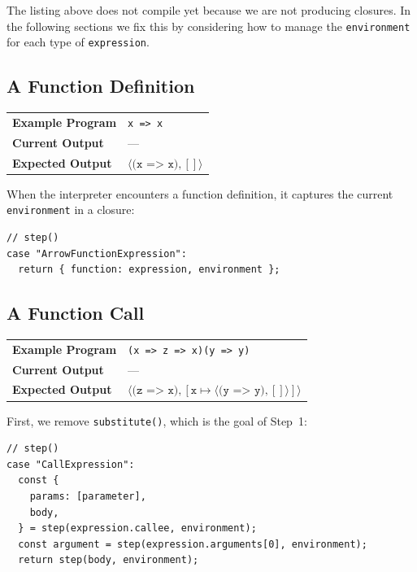\documentclass[12pt, oneside]{book}
\begin{document}
The listing above does not compile yet because we are not producing closures. In the following sections we fix this by considering how to manage the \texttt{environment} for each type of \texttt{expression}.

\subsection{A Function Definition}

\begin{center}
\begin{tabular}{ll}
\textbf{Example Program} & \texttt{x => x} \\
\textbf{Current Output} & — \\
\textbf{Expected Output} & $\langle \texttt{(x => x)}, [] \rangle$ \\
\end{tabular}
\end{center}

When the interpreter encounters a function definition, it captures the current \texttt{environment} in a closure:

\begin{verbatim}
// step()
case "ArrowFunctionExpression":
  return { function: expression, environment };
\end{verbatim}

\subsection{A Function Call}
\label{A Function Call}

\begin{center}
\begin{tabular}{ll}
\textbf{Example Program} & \texttt{(x => z => x)(y => y)} \\
\textbf{Current Output} & — \\
\textbf{Expected Output} & $\langle \texttt{(z => x)}, [\texttt{x} \mapsto \langle \texttt{(y => y)}, [] \rangle] \rangle$ \\
\end{tabular}
\end{center}

First, we remove \texttt{substitute()}, which is the goal of Step~1:

\begin{verbatim}
// step()
case "CallExpression":
  const {
    params: [parameter],
    body,
  } = step(expression.callee, environment);
  const argument = step(expression.arguments[0], environment);
  return step(body, environment);
\end{verbatim}
\end{document}
